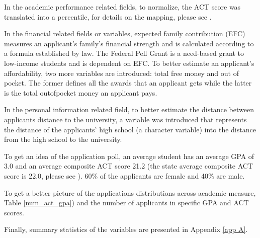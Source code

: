 \documentclass[12pt,english]{report}
\begin{document}
In the academic performance related fields, to normalize, the ACT score was
translated into a percentile, for details on the mapping, please see
\citet{ACT_percentile}.
 
In the financial related fields or variables, expected family contribution
(EFC) measures an applicant's family's financial strength and is calculated
according to a formula established by law. The Federal Pell Grant is a
need-based grant to low-income students and is dependent on EFC. To better
estimate an applicant's affordability, two more variables are introduced: total
free money and out of pocket. The former defines all the awards that an
applicant gets while the latter is the total out\-of\-pocket money an applicant
pays.

In the personal information related field, to better estimate the distance
between applicants distance to the university, a variable was introduced that
represents the distance of the applicants' high school (a character variable)
into the distance from the high school to the university.

To get an idea of the application poll, an average student has an average GPA
of 3.0 and an average composite ACT score 21.2 (the state average composite ACT
score is 22.0, please see \citet{mean_sat}). 60\% of the applicants are female
and 40\% are male.  %
    
To get a better picture of the applications distributions across academic
measure, Table \ref{num_act_gpa}) and the number of applicants in specific GPA
and ACT scores. 

Finally, summary statistics of the variables are presented in Appendix \ref{app
A}.
\end{document}
